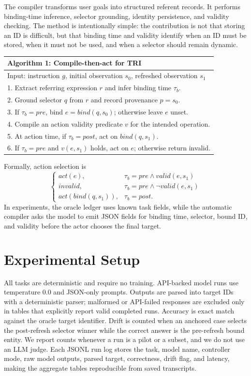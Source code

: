 \documentclass[letterpaper]{article}
\begin{document}
The compiler transforms user goals into structured referent records. It performs binding-time inference, selector grounding, identity persistence, and validity checking. The method is intentionally simple: the contribution is not that storing an ID is difficult, but that binding time and validity identify when an ID must be stored, when it must not be used, and when a selector should remain dynamic.

\begin{center}
\centering
\small
\begin{tabular}{@{}p{}@{}}
\toprule
\textbf{Algorithm 1: Compile-then-act for TRI} \\
\midrule
Input: instruction $g$, initial observation $s_0$, refreshed observation $s_1$ \\
1. Extract referring expression $r$ and infer binding time $\tau_b$. \\
2. Ground selector $q$ from $r$ and record provenance $p=s_0$. \\
3. If $\tau_b=pre$, bind $e=bind(q,s_0)$; otherwise leave $e$ unset. \\
4. Compile an action validity predicate $v$ for the intended operation. \\
5. At action time, if $\tau_b=post$, act on $bind(q,s_1)$. \\
6. If $\tau_b=pre$ and $v(e,s_1)$ holds, act on $e$; otherwise return invalid. \\
\bottomrule
\end{tabular}
\end{center}

Formally, action selection is
\[
\begin{cases}
act(e), & \tau_b = pre \land valid(e,s_1) \\
invalid, & \tau_b = pre \land \neg valid(e,s_1) \\
act(bind(q,s_1)), & \tau_b = post.
\end{cases}
\]
In experiments, the oracle ledger uses known task fields, while the automatic compiler asks the model to emit JSON fields for binding time, selector, bound ID, and validity before the actor chooses the final target.

\section{Experimental Setup}

All tasks are deterministic and require no training. API-backed model runs use temperature 0.0 and JSON-only prompts. Outputs are parsed into target IDs with a deterministic parser; malformed or API-failed responses are excluded only in tables that explicitly report valid completed runs. Accuracy is exact match against the oracle target identifier. Drift is counted when an anchored case selects the post-refresh selector winner while the correct answer is the pre-refresh bound entity. We report counts whenever a run is a pilot or a subset, and we do not use an LLM judge. Each JSONL run log stores the task, model name, controller mode, raw model outputs, parsed target, correctness, drift flag, and latency, making the aggregate tables reproducible from saved transcripts.
\end{document}
